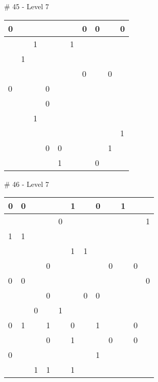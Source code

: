 \medskip

\# 45 - Level 7 \newline
\begin{tabular}{|m{\collen}|m{\collen}|m{\collen}|m{\collen}|m{\collen}|m{\collen}|m{\collen}|m{\collen}|m{\collen}|m{\collen}|}
\hline
  0 &   &   &   &   &   & 0 & 0 &   & 0 \\
\hline
    &   & 1 &   &   & 1 &   &   &   &   \\
\hline
    & 1 &   &   &   &   &   &   &   &   \\
\hline
    &   &   &   &   &   & 0 &   & 0 &   \\
\hline
  0 &   &   & 0 &   &   &   &   &   &   \\
\hline
    &   &   & 0 &   &   &   &   &   &   \\
\hline
    &   & 1 &   &   &   &   &   &   &   \\
\hline
    &   &   &   &   &   &   &   &   & 1 \\
\hline
    &   &   & 0 & 0 &   &   &   & 1 &   \\
\hline
    &   &   &   & 1 &   &   & 0 &   &   \\
\hline
\end{tabular}


\medskip

\# 46 - Level 7 \newline
\begin{tabular}{|m{\collen}|m{\collen}|m{\collen}|m{\collen}|m{\collen}|m{\collen}|m{\collen}|m{\collen}|m{\collen}|m{\collen}|m{\collen}|m{\collen}|}
\hline
  0 & 0 &   &   &   & 1 &   & 0 &   & 1 &   &   \\
\hline
    &   &   &   & 0 &   &   &   &   &   &   & 1 \\
\hline
  1 & 1 &   &   &   &   &   &   &   &   &   &   \\
\hline
    &   &   &   &   & 1 & 1 &   &   &   &   &   \\
\hline
    &   &   & 0 &   &   &   &   & 0 &   & 0 &   \\
\hline
  0 & 0 &   &   &   &   &   &   &   &   &   & 0 \\
\hline
    &   &   & 0 &   &   & 0 & 0 &   &   &   &   \\
\hline
    &   & 0 &   & 1 &   &   &   &   &   &   &   \\
\hline
  0 & 1 &   & 1 &   & 0 &   & 1 &   &   & 0 &   \\
\hline
    &   &   & 0 &   & 1 &   &   & 0 &   & 0 &   \\
\hline
  0 &   &   &   &   &   &   & 1 &   &   &   &   \\
\hline
    &   & 1 & 1 &   & 1 &   &   &   &   &   &   \\
\hline
\end{tabular}


\medskip

